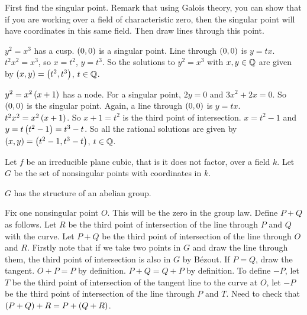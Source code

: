 \begin{algorithm}
First find the singular point. Remark that using Galois theory, you can show that if you are working over a field of characteristic zero, then the singular point will have coordinates in this same field. Then draw lines through this point.
\end{algorithm}


\begin{example*}
$ y^2 = x^3 $ has a cusp. $ \br{0, 0} $ is a singular point. Line through $ \br{0, 0} $ is $ y = tx $. $ t^2x^2 = x^3 $, so $ x = t^2 $, $ y = t^3 $. So the solutions to $ y^2 = x^3 $ with $ x, y \in \mathbb{Q} $ are given by $ \br{x, y} = \br{t^2, t^3} $, $ t \in \mathbb{Q} $.
\end{example*}

\begin{example*}
$ y^2 = x^2\br{x + 1} $ has a node. For a singular point, $ 2y = 0 $ and $ 3x^2 + 2x = 0 $. So $ \br{0, 0} $ is the singular point. Again, a line through $ \br{0, 0} $ is $ y = tx $. $ t^2x^2 = x^2\br{x + 1} $. So $ x + 1 = t^2 $ is the third point of intersection. $ x = t^2 - 1 $ and $ y = t\br{t^2 - 1} = t^3 - t $. So all the rational solutions are given by $ \br{x, y} = \br{t^2 - 1, t^3 - t} $, $ t \in \mathbb{Q} $.
\end{example*}

\pagebreak

Let $ f $ be an irreducible plane cubic, that is it does not factor, over a field $ k $. Let $ G $ be the set of nonsingular points with coordinates in $ k $.

\begin{theorem}
$ G $ has the structure of an abelian group.
\end{theorem}

Fix one nonsingular point $ O $. This will be the zero in the group law. Define $ P + Q $ as follows. Let $ R $ be the third point of intersection of the line through $ P $ and $ Q $ with the curve. Let $ P + Q $ be the third point of intersection of the line through $ O $ and $ R $. Firstly note that if we take two points in $ G $ and draw the line through them, the third point of intersection is also in $ G $ by Bézout. If $ P = Q $, draw the tangent. $ O + P = P $ by definition. $ P + Q = Q + P $ by definition. To define $ -P $, let $ T $ be the third point of intersection of the tangent line to the curve at $ O $, let $ -P $ be the third point of intersection of the line through $ P $ and $ T $. Need to check that $ \br{P + Q} + R = P + \br{Q + R} $.

